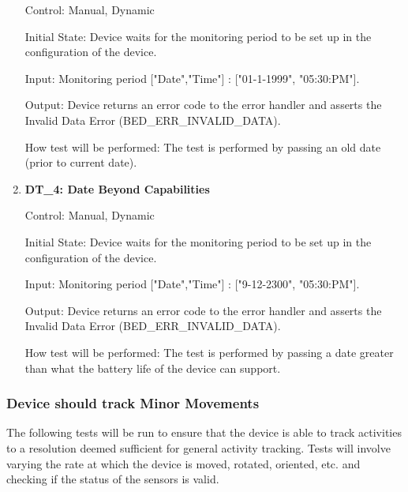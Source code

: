 \documentclass[12pt, titlepage]{article}
\begin{document}
\begin{enumerate}
		Control: Manual, Dynamic
							
		Initial State: Device waits for the monitoring period to be set up in the configuration of the device.
							
		Input: Monitoring period ["Date","Time"] : ["01-1-1999", "05:30:PM"].
							
		Output: Device returns an error code to the error handler and asserts the Invalid Data Error (BED\_ERR\_INVALID\_DATA).
		
		How test will be performed: The test is performed by passing an old date (prior to current date).

	\item{\textbf{DT\_4: Date Beyond Capabilities}\\}\label{DT4}
		
		Control: Manual, Dynamic
							
		Initial State: Device waits for the monitoring period to be set up in the configuration of the device.
							
		Input: Monitoring period ["Date","Time"] : ["9-12-2300", "05:30:PM"].
							
		Output: Device returns an error code to the error handler and asserts the Invalid Data Error (BED\_ERR\_INVALID\_DATA).

		How test will be performed: The test is performed by passing a date greater than what the battery life of the device can support.

\end{enumerate}
\newpage
\subsubsection{Device should track Minor Movements}
The following tests will be run to ensure that the device is able to track activities to a resolution deemed sufficient for general activity tracking. Tests will involve varying the rate at which the device is moved, rotated, oriented, etc. and checking if the status of the sensors is valid.
\end{document}
